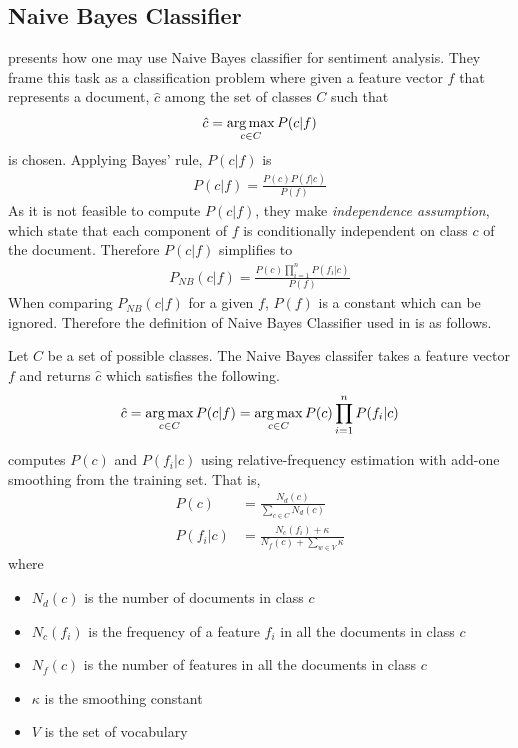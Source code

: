 \subsection{Naive Bayes Classifier}
\cite{pang2002thumbs} presents how one may use Naive Bayes classifier for sentiment analysis. They frame this task as a classification problem where given a feature vector $f$ that represents a document, $\hat{c}$ among the set of classes $C$ such that
\begin{align*}
\hat{c} = \operatorname*{arg\,max}_{c \in C}P(c|f)
\end{align*}
is chosen.
 Applying Bayes' rule, $P(c|f)$ is
\begin{align*}
P(c|f) = \frac{P(c)P(f|c)}{P(f)}
\end{align*}
As it is not feasible to compute $P(c|f)$, they make {\em independence assumption}, which state that each component of $f$ is conditionally independent on class $c$ of the document.
Therefore $P(c|f)$ simplifies to
\begin{align*}
P_{NB}(c|f) = \frac{P(c)\prod_{i=1}^{n}P(f_i|c)}{P(f)}
\end{align*}
When comparing $P_{NB}(c|f)$ for a given $f$, $P(f)$ is a constant which can be ignored. Therefore the definition of Naive Bayes Classifier used in \cite{pang2002thumbs} is as follows.
\begin{definition}
Let $C$ be a set of possible classes. The Naive Bayes classifer takes a feature vector $f$ and returns $\hat{c}$ which satisfies the following.
\begin{align*}
\hat{c} = \operatorname*{arg\,max}_{c \in C}P(c|f) = \operatorname*{arg\,max}_{c \in C}P(c)\prod_{i=1}^{n}P(f_i|c)
\end{align*}
\end{definition}
\cite{pang2002thumbs} computes $P(c)$ and $P(f_i|c)$ using relative-frequency estimation with add-one smoothing from the training set. That is,
\begin{align*}
P(c) &= \frac{N_d(c)}{\sum\limits_{c \in C}^{}N_d(c)}\\
P(f_i|c) &= \frac{N_c(f_i)+\kappa }{N_f(c) + \sum\limits_{w \in V} \kappa}
\end{align*}
where 
\begin{itemize}
\item $N_d(c)$ is the number of documents in class $c$
\item $N_c(f_i)$ is the frequency of a feature $f_i$ in all the documents in class $c$
\item $N_f(c)$ is the number of features in all the documents in class $c$
\item $\kappa$ is the smoothing constant
\item $V$ is the set of vocabulary
\end{itemize}
